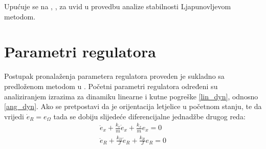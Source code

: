 \documentclass[times, utf8, diplomski, numeric]{fer}
\begin{document}
	\noindent Upućuje se na \cite{2010arXiv1003.2005L}, \cite{5717652}, \cite{2011arXiv1109.4457L} za uvid u provedbu analize stabilnosti Ljapunovljevom metodom. 
	
	\newpage
	\clearpage
	
	\section{Parametri regulatora}
	Postupak pronalaženja parametera regulatora proveden je sukladno sa predloženom metodom u \cite{zavrsniCirjak}.
	Početni parametri regulatora određeni su analiziranjem izrazima za dinamiku linearne i kutne pogreške \ref{lin_dyn}, odnosno  \ref{ang_dyn}. Ako se pretpostavi da je orijentacija letjelice u početnom stanju, te da vrijedi $\dot{e}_R=e_\Omega$ tada se dobiju slijedeće diferencijalne jednadžbe drugog reda:
	\begin{gather}
		\ddot{e}_x + \frac{k_v}{m}\dot{e}_x + \frac{k_x}{m}e_x = 0 \\
		\ddot{e}_R + \frac{k_\Omega}{J}\dot{e}_R + \frac{k_R}{J}e_R = 0
	\end{gather}
	
\end{document}
